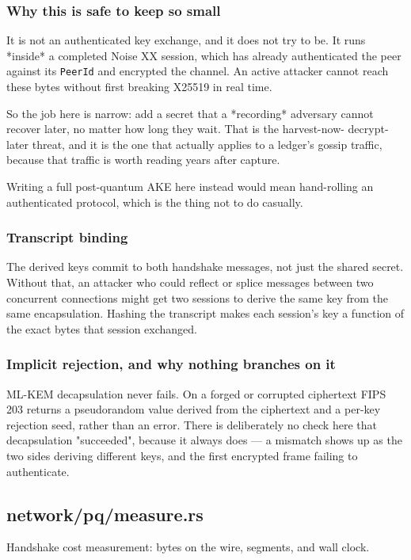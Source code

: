 \documentclass[11pt,a4paper]{article}
\begin{document}
\subsubsection{Why this is safe to keep so small}

It is not an authenticated key exchange, and it does not try to be. It runs
*inside* a completed Noise XX session, which has already authenticated the
peer against its \texttt{PeerId} and encrypted the channel. An active attacker
cannot reach these bytes without first breaking X25519 in real time.

So the job here is narrow: add a secret that a *recording* adversary cannot
recover later, no matter how long they wait. That is the harvest-now-
decrypt-later threat, and it is the one that actually applies to a ledger's
gossip traffic, because that traffic is worth reading years after capture.

Writing a full post-quantum AKE here instead would mean hand-rolling an
authenticated protocol, which is the thing not to do casually.

\subsubsection{Transcript binding}

The derived keys commit to both handshake messages, not just the shared
secret. Without that, an attacker who could reflect or splice messages
between two concurrent connections might get two sessions to derive the same
key from the same encapsulation. Hashing the transcript makes each session's
key a function of the exact bytes that session exchanged.

\subsubsection{Implicit rejection, and why nothing branches on it}

ML-KEM decapsulation never fails. On a forged or corrupted ciphertext FIPS
203 returns a pseudorandom value derived from the ciphertext and a per-key
rejection seed, rather than an error. There is deliberately no check here
that decapsulation "succeeded", because it always does — a mismatch shows up
as the two sides deriving different keys, and the first encrypted frame
failing to authenticate.

\subsection{network/pq/measure.rs}
Handshake cost measurement: bytes on the wire, segments, and wall clock.
\end{document}
